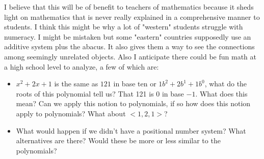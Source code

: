 \documentclass[12pt]{article}
\begin{document}
I believe that this will be of benefit to teachers of mathematics because it sheds light on mathematics that is never really explained in a comprehensive manner to students.  I think this might be why a lot of "western" students struggle with numeracy.  I might be mistaken but some "eastern" countries supposedly use an additive system plus the abacus.  It also gives them a way to see the connections among seemingly unrelated objects.  Also I anticipate there could be fun math at a high school level to analyze, a few of which are: 
\begin{itemize}
\item $x^2+2x+1$ is the same as $121$ in base ten or $1b^2+2b^1+1b^0$, what do the roots of this polynomial tell us?  That 121 is 0 in base $-1$.  What does this mean?  Can we apply this notion to polynomials, if so how does this notion apply to polynomials?  What about $<1, 2, 1>$?

\item What would happen if we didn't have a positional number system?  What alternatives are there?  Would these be more or less similar to the polynomials? 

\end{itemize}
\end{document}
